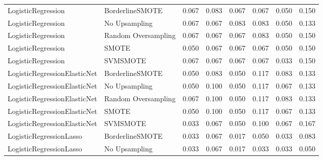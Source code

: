 \begin{tabular}{llllllll}
          LogisticRegression &     BorderlineSMOTE & 0.067 &                     0.083 &                 0.067 &                  0.067 &                                   0.050 &    0.150 \\
          LogisticRegression &       No Upsampling & 0.067 &                     0.067 &                 0.083 &                  0.083 &                                   0.050 &    0.133 \\
          LogisticRegression & Random Oversampling & 0.067 &                     0.067 &                 0.067 &                  0.083 &                                   0.050 &    0.150 \\
          LogisticRegression &               SMOTE & 0.050 &                     0.067 &                 0.067 &                  0.067 &                                   0.050 &    0.150 \\
          LogisticRegression &            SVMSMOTE & 0.067 &                     0.067 &                 0.067 &                  0.067 &                                   0.033 &    0.150 \\
LogisticRegressionElasticNet &     BorderlineSMOTE & 0.050 &                     0.083 &                 0.050 &                  0.117 &                                   0.083 &    0.133 \\
LogisticRegressionElasticNet &       No Upsampling & 0.050 &                     0.100 &                 0.050 &                  0.117 &                                   0.067 &    0.133 \\
LogisticRegressionElasticNet & Random Oversampling & 0.067 &                     0.100 &                 0.050 &                  0.117 &                                   0.083 &    0.133 \\
LogisticRegressionElasticNet &               SMOTE & 0.050 &                     0.100 &                 0.050 &                  0.117 &                                   0.067 &    0.133 \\
LogisticRegressionElasticNet &            SVMSMOTE & 0.033 &                     0.067 &                 0.050 &                  0.100 &                                   0.067 &    0.167 \\
     LogisticRegressionLasso &     BorderlineSMOTE & 0.033 &                     0.067 &                 0.017 &                  0.050 &                                   0.033 &    0.083 \\
     LogisticRegressionLasso &       No Upsampling & 0.033 &                     0.067 &                 0.017 &                  0.033 &                                   0.033 &    0.050 \\

\end{tabular}
